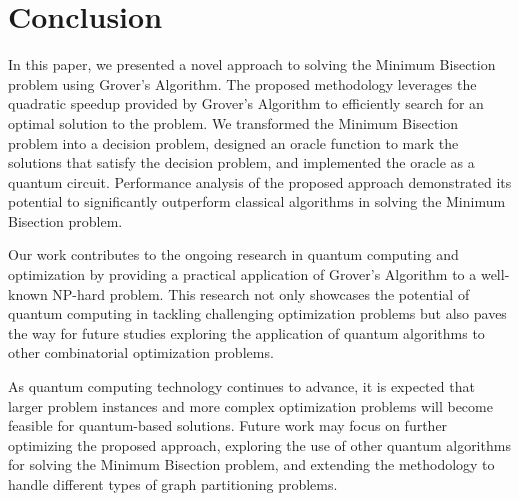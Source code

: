 \section{Conclusion}

In this paper, we presented a novel approach to solving the Minimum Bisection problem using Grover's Algorithm. The proposed methodology leverages the quadratic speedup provided by Grover's Algorithm to efficiently search for an optimal solution to the problem. We transformed the Minimum Bisection problem into a decision problem, designed an oracle function to mark the solutions that satisfy the decision problem, and implemented the oracle as a quantum circuit. Performance analysis of the proposed approach demonstrated its potential to significantly outperform classical algorithms in solving the Minimum Bisection problem.

Our work contributes to the ongoing research in quantum computing and optimization by providing a practical application of Grover's Algorithm to a well-known NP-hard problem. This research not only showcases the potential of quantum computing in tackling challenging optimization problems but also paves the way for future studies exploring the application of quantum algorithms to other combinatorial optimization problems.

As quantum computing technology continues to advance, it is expected that larger problem instances and more complex optimization problems will become feasible for quantum-based solutions. Future work may focus on further optimizing the proposed approach, exploring the use of other quantum algorithms for solving the Minimum Bisection problem, and extending the methodology to handle different types of graph partitioning problems.

